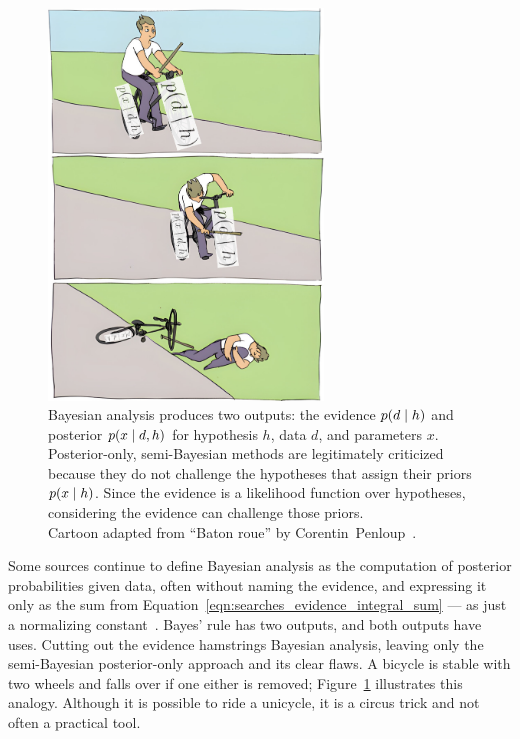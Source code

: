 \begin{figure}[tp]
\centering
\includegraphics[width=0.65\textwidth]{figures/searches_baton_roue_bayes.jpg}
\caption[
Bayesian analysis produces two outputs: the evidence and posterior
]{%
Bayesian analysis produces two outputs: the
evidence $p(d \mid h)$ and
posterior $p(x \mid d,h)$ for hypothesis $h$, data $d$, and parameters $x$.
Posterior-only, semi-Bayesian methods are legitimately criticized because they
do not challenge the hypotheses that assign their priors $p(x \mid h)$.
Since the evidence is a likelihood function over hypotheses, considering the
evidence can challenge those priors.
\\[0.5em]
Cartoon adapted from ``Baton roue'' by
Corentin~Penloup~\cite{penloup2011baton}.
}
\label{fig:searches_baton_roue_bayes}
\end{figure}

Some sources continue to define Bayesian analysis as the computation of
posterior probabilities given data, often without naming the evidence, and
expressing it only as the sum from
Equation~\ref{eqn:searches_evidence_integral_sum}
--- as just a normalizing constant~\cite{
gelman1995bayesian,
gelman2008objections,
DAgostini:1994fjx,
DAgostini:2010hil,
cowan1998statistical,
pdg2020review
}.
Bayes' rule has two outputs, and both outputs have uses.
Cutting out the evidence hamstrings Bayesian analysis, leaving only the
semi-Bayesian posterior-only approach and its clear flaws.
A bicycle is stable with two wheels and falls over if one either
is removed;
Figure~\ref{fig:searches_baton_roue_bayes} illustrates this analogy.
Although it is possible to ride a unicycle, it is a circus trick and not often
a practical tool.

